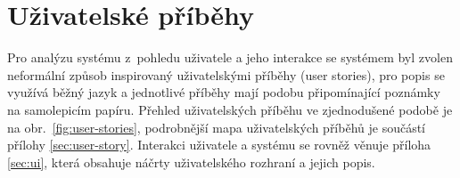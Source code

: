 \documentclass[twoside]{ctuthesis}
\begin{document}
\newpage
\section{Uživatelské příběhy}\label{uc-analysis}

Pro analýzu systému z~pohledu uživatele a jeho interakce se systémem byl zvolen neformální způsob inspirovaný uživatelskými příběhy (user stories), pro popis se využívá běžný jazyk a jednotlivé příběhy mají podobu připomínající poznámky na samolepicím papíru. Přehled uživatelských příběhu ve zjednodušené podobě je na obr.~\ref{fig:user-stories}, podrobnější mapa uživatelských příběhů je součástí přílohy \ref{sec:user-story}. Interakci uživatele a systému se rovněž věnuje příloha \ref{sec:ui}, která obsahuje náčrty uživatelského rozhraní a jejich popis.
%



\end{document}
